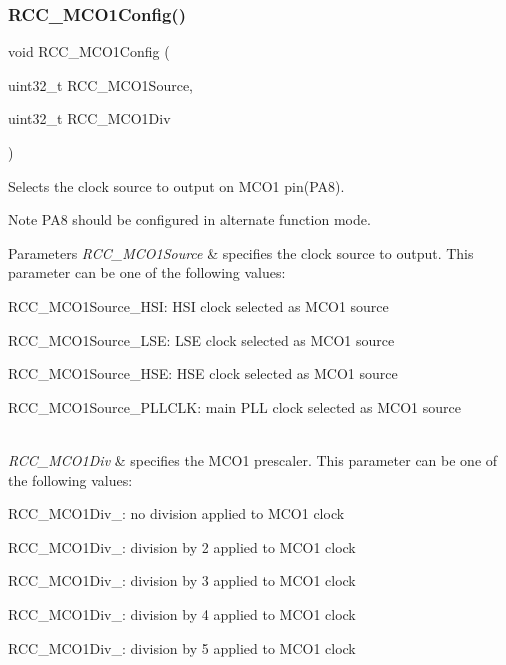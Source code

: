 \mbox{\label{group___r_c_c_ga15c9ecb6ef015ed008cb28e5b7a50531}} 
\subsubsection{\texorpdfstring{R\+C\+C\+\_\+\+M\+C\+O1\+Config()}{RCC\_MCO1Config()}}
{\footnotesize\ttfamily void R\+C\+C\+\_\+\+M\+C\+O1\+Config (\begin{DoxyParamCaption}\item[{uint32\+\_\+t}]{R\+C\+C\+\_\+\+M\+C\+O1\+Source,  }\item[{uint32\+\_\+t}]{R\+C\+C\+\_\+\+M\+C\+O1\+Div }\end{DoxyParamCaption})}



Selects the clock source to output on M\+C\+O1 pin(\+P\+A8). 

\begin{DoxyNote}{Note}
P\+A8 should be configured in alternate function mode. 
\end{DoxyNote}

\begin{DoxyParams}{Parameters}
{\em R\+C\+C\+\_\+\+M\+C\+O1\+Source} & specifies the clock source to output. This parameter can be one of the following values\+: \begin{DoxyItemize}
\item R\+C\+C\+\_\+\+M\+C\+O1\+Source\+\_\+\+H\+SI\+: H\+SI clock selected as M\+C\+O1 source \item R\+C\+C\+\_\+\+M\+C\+O1\+Source\+\_\+\+L\+SE\+: L\+SE clock selected as M\+C\+O1 source \item R\+C\+C\+\_\+\+M\+C\+O1\+Source\+\_\+\+H\+SE\+: H\+SE clock selected as M\+C\+O1 source \item R\+C\+C\+\_\+\+M\+C\+O1\+Source\+\_\+\+P\+L\+L\+C\+LK\+: main P\+LL clock selected as M\+C\+O1 source \end{DoxyItemize}
\\
\hline
{\em R\+C\+C\+\_\+\+M\+C\+O1\+Div} & specifies the M\+C\+O1 prescaler. This parameter can be one of the following values\+: \begin{DoxyItemize}
\item R\+C\+C\+\_\+\+M\+C\+O1\+Div\+\_\+: no division applied to M\+C\+O1 clock \item R\+C\+C\+\_\+\+M\+C\+O1\+Div\+\_\+: division by 2 applied to M\+C\+O1 clock \item R\+C\+C\+\_\+\+M\+C\+O1\+Div\+\_\+: division by 3 applied to M\+C\+O1 clock \item R\+C\+C\+\_\+\+M\+C\+O1\+Div\+\_\+: division by 4 applied to M\+C\+O1 clock \item R\+C\+C\+\_\+\+M\+C\+O1\+Div\+\_\+: division by 5 applied to M\+C\+O1 clock \end{DoxyItemize}
\\
\hline
\end{DoxyParams}

